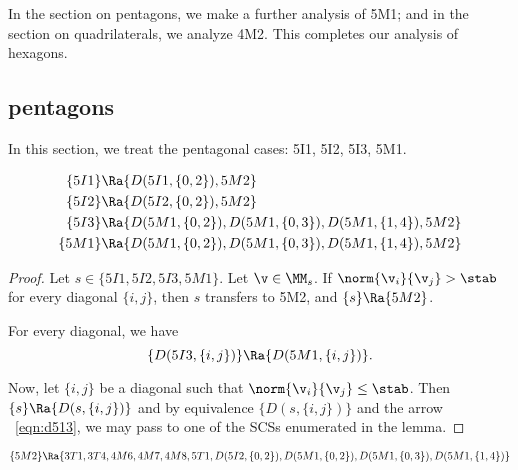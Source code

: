 In the section on pentagons, we make a further analysis of 5M1; and in the section on quadrilaterals, we analyze 4M2.
This completes our analysis of hexagons.  

\subsection{pentagons}

In this section, we treat the pentagonal cases: 5I1, 5I2, 5I3, 5M1.

\begin{lemma}[]
\begin{align*}
\{5I1\}&\Ra \{D(5I1,\{0,2\}),5M2\}\\
\{5I2\}&\Ra \{D(5I2,\{0,2\}),5M2\}\\
\{5I3\}&\Ra \{D(5M1,\{0,2\}),D(5M1,\{0,3\}),D(5M1,\{1,4\}),5M2\}\\
\{5M1\}&\Ra \{D(5M1,\{0,2\}),D(5M1,\{0,3\}),D(5M1,\{1,4\}),5M2\}\\
\end{align*}
\end{lemma}

\begin{proof}
Let  $s\in \{5I1,5I2,5I3,5M1\}$.
Let $\v\in\MM_s$.  If $\norm{\v_i}{\v_j}>\stab$ for every diagonal $\{i,j\}$, then $s$ transfers to 5M2,
and $\{s\}\Ra \{5M2\}$.

For every diagonal,
we have 
\begin{equation}\label{eqn:d513}
\{D(5I3,\{i,j\})\}\Ra \{D(5M1,\{i,j\})\}.
\end{equation}

Now, let $\{i,j\}$ be a diagonal such that $\norm{\v_i}{\v_j}\le \stab$.  
Then $\{s\}\Ra \{D(s,\{i,j\})\}$ and by equivalence $\{D(s,\{i,j\})\}$ and the arrow ~\eqref{eqn:d513},
we may pass to one of the SCSs enumerated in the lemma.
\end{proof}

\begin{lemma}[]
\[
\{5M2\}\Ra \{3T1,3T4,4M6,4M7,4M8,5T1,D(5I2,\{0,2\}),D(5M1,\{0,2\}),D(5M1,\{0,3\}),D(5M1,\{1,4\}) \}
\]
\end{lemma}

